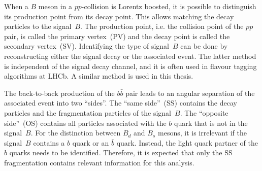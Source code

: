 When a $B$ meson in a $pp$-collision is Lorentz boosted, it is possible to distinguish its production point from its decay point.
This allows matching the decay particles to the signal~$B$.
The production point, i.e. the collision point of the $pp$ pair, is called the primary vertex~(PV) and the decay point is called the secondary vertex~(SV).
Identifying the type of signal~$B$ can be done by reconstructing either the signal decay or the associated event. 
The latter method is independent of the signal decay channel, and it is often used in flavour tagging algorithms at LHCb. 
A similar method is used in this thesis.

The back-to-back production of the $b\bar{b}$ pair leads to an angular separation of the associated event into two \enquote{sides}.
The \enquote{same side}~(SS) contains the decay particles and the fragmentation particles of the signal~$B$.
The \enquote{opposite side}~(OS) contains all particles associated with the $b$ quark that is not in the signal~$B$.
For the distinction between $B_d$ and $B_s$ mesons, it is irrelevant if the signal~$B$ contains a $b$ quark or an $\bar{b}$ quark.
Instead, the light quark partner of the $b$ quarks needs to be identified.
Therefore, it is expected that only the SS fragmentation contains relevant information for this analysis. 
